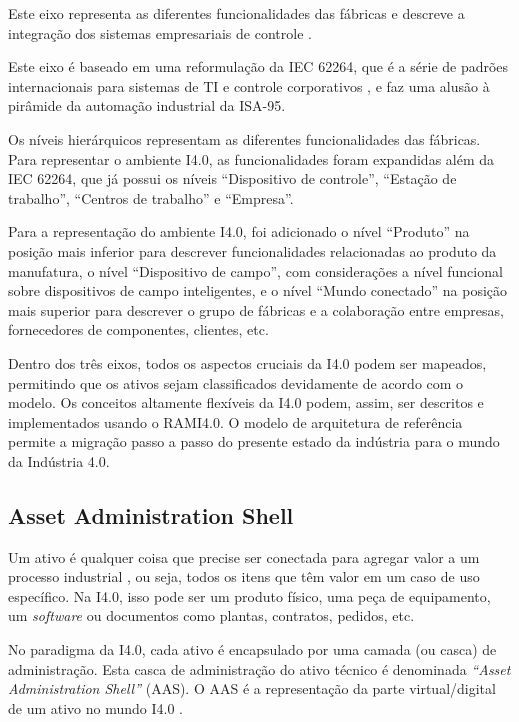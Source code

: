 	Este eixo representa as diferentes funcionalidades das fábricas e descreve a integração dos sistemas empresariais de controle \cite{pisching2018arquitetura}.
	
	Este eixo é baseado em uma reformulação da IEC 62264, que é a série de padrões internacionais para sistemas de TI e controle corporativos \cite{hankel2015rami}, e faz uma alusão à pirâmide da automação industrial da ISA-95.
	
	Os níveis hierárquicos representam as diferentes funcionalidades das fábricas. Para representar o ambiente I4.0, as funcionalidades foram expandidas além da IEC 62264, que já possui os níveis ``Dispositivo de controle'', ``Estação de trabalho'', ``Centros de trabalho'' e ``Empresa''.
	
	Para a representação do ambiente I4.0, foi adicionado o nível ``Produto'' na posição mais inferior para descrever funcionalidades relacionadas ao produto da manufatura, o nível ``Dispositivo de campo'', com considerações a nível funcional sobre dispositivos de campo inteligentes, e o nível ``Mundo conectado'' na posição mais superior para descrever o grupo de fábricas e a colaboração entre empresas, fornecedores de componentes, clientes, etc. 

	Dentro dos três eixos, todos os aspectos cruciais da I4.0 podem ser mapeados, permitindo que os ativos sejam classificados devidamente de acordo com o modelo. Os conceitos altamente flexíveis da I4.0 podem, assim, ser descritos e implementados usando o RAMI4.0. O modelo de arquitetura de referência permite a migração passo a passo do presente estado da indústria para o mundo da Indústria 4.0.
	
	\subsection{Asset Administration Shell}
	
	Um ativo é qualquer coisa que precise ser conectada para agregar valor a um processo industrial \cite{bader2019aas}, ou seja, todos os itens que têm valor em um caso de uso específico. Na I4.0, isso pode ser um produto físico, uma peça de equipamento, um \textit{software} ou documentos como plantas, contratos, pedidos, etc.
	
	No paradigma da I4.0, cada ativo é encapsulado por uma camada (ou casca) de administração. Esta casca de administração do ativo técnico é denominada \textit{``Asset Administration Shell''} (AAS). O AAS é a representação da parte virtual/digital de um ativo no mundo I4.0 \cite{ye2019aas}.
	
